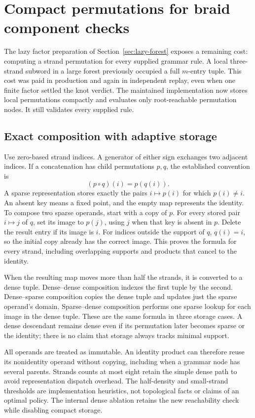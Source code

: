 \section{Compact permutations for braid component checks}
\label{sec:compact-permutations}

The lazy factor preparation of Section~\ref{sec:lazy-forest} exposes a
remaining cost: computing a strand permutation for every supplied grammar
rule. A local three-strand subword in a large forest previously occupied a
full $m$-entry tuple. This cost was paid in production and again in independent
replay, even when one finite factor settled the knot verdict. The maintained
implementation now stores local permutations compactly and evaluates only
root-reachable permutation nodes. It still validates every supplied rule.

\subsection{Exact composition with adaptive storage}

Use zero-based strand indices. A generator of either sign exchanges two
adjacent indices. If a concatenation has child permutations $p,q$, the
established convention is
\[
 (p\circ q)(i)=p(q(i)).
\]
A sparse representation stores exactly the pairs $i\mapsto p(i)$ for which
$p(i)\ne i$. An absent key means a fixed point, and the empty map represents
the identity. To compose two sparse operands, start with a copy of $p$.
For every stored pair $i\mapsto j$ of $q$, set its image to $p(j)$, using
$j$ when that key is absent in $p$. Delete the result entry if its image is
$i$. For indices outside the support of $q$, $q(i)=i$, so the initial copy
already has the correct image. This proves the formula for every strand,
including overlapping supports and products that cancel to the identity.

When the resulting map moves more than half the strands, it is converted to
a dense tuple. Dense--dense composition indexes the first tuple by the
second. Dense--sparse composition copies the dense tuple and updates just
the sparse operand's domain. Sparse--dense composition performs one sparse
lookup for each image in the dense tuple. These are the same formula in
three storage cases. A dense descendant remains dense even if its permutation
later becomes sparse or the identity; there is no claim that storage always
tracks minimal support.

All operands are treated as immutable. An identity product can therefore
reuse its nonidentity operand without copying, including when a grammar node
has several parents. Strands counts at most eight retain the simple dense
path to avoid representation dispatch overhead. The half-density and
small-strand thresholds are implementation heuristics, not topological facts
or claims of an optimal policy. The internal dense ablation retains the new
reachability check while disabling compact storage.

